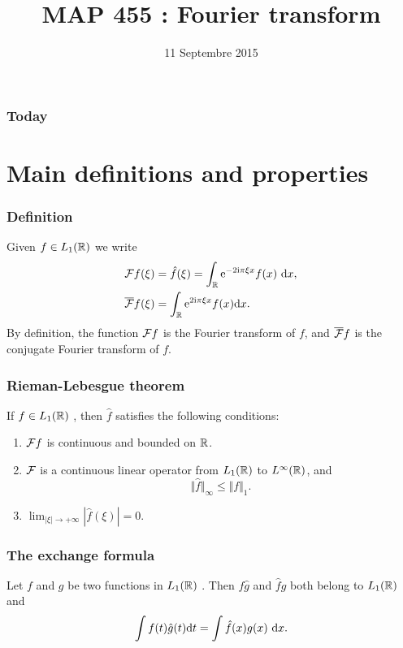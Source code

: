 

\title{MAP 455 : Fourier transform}

\date{11 Septembre 2015}
\maketitle



\begin{frame}
\frametitle{Today}
\tableofcontents
\end{frame}
\section{Main definitions and properties}
\begin{frame}
\frametitle{Definition}
\begin{definition}
Given $f\in L_1(\mathbb{R})$ we write
\begin{align*}
&\TF f(\xi)=\hat{f}(\xi)=\int_{\rset} \rme^{-2\rmi\pi\xi x}f(x)\ \rmd x, \\
&\TFC f(\xi)=\int_{\mathbb{R}}\rme^{2\rmi\pi\xi x}f(x) \rmd x. \\
\end{align*}
By definition, the function $\mathcal{F} f$ is the Fourier transform of $f$, and $\overline{\mathcal{F}} f$ is the conjugate Fourier transform of $f$.
\end{definition}
\end{frame} 

\begin{frame}
\frametitle{Rieman-Lebesgue theorem}
\begin{theorem}  If $f\in L_1(\mathbb{R})$ , then $\hat{f}$ satisfies the following conditions:
\begin{enumerate}[label=(\roman*)]
\item $\mathcal{F} f$ is continuous  and bounded on $\mathbb{R}$.
\item $\mathcal{F}$  is a  continuous linear operator from $L_1(\mathbb{R})$  to $L^{\infty}(\mathbb{R})$, and
$$
\Vert\hat{f}\Vert_{\infty}\leq\Vert f\Vert_{1}.
$$
\item $\lim_{|\xi|\rightarrow+\infty} |\hat{f}(\xi)|=0$. 
\end{enumerate}
\end{theorem}
\end{frame}

\begin{frame}
\frametitle{The exchange formula}
\begin{theorem}
 Let $f$ and $g$  be two functions in $L_1(\mathbb{R})$ . Then $f\hat{g}$
and $\hat{f}g$ both belong to $L_1(\mathbb{R})$ and
$$
\int f(t)\hat{g}(t)\rmd t=\int\hat{f}(x)g(x)\ \rmd x.
$$
\end{theorem}
\end{frame}

